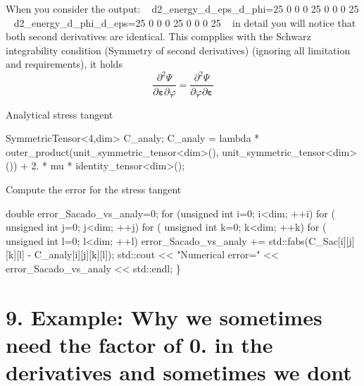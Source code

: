  When you consider the output\+: ~\newline
d2\+\_\+energy\+\_\+d\+\_\+eps\+\_\+d\+\_\+phi=25 0 0 0 25 0 0 0 25 ~\newline
d2\+\_\+energy\+\_\+d\+\_\+phi\+\_\+d\+\_\+eps=25 0 0 0 25 0 0 0 25 ~\newline
in detail you will notice that both second derivatives are identical. This compplies with the Schwarz integrability condition (Symmetry of second derivatives) (ignoring all limitation and requirements), it holds \[ \frac{\partial^2 \Psi}{\partial \boldsymbol{\varepsilon} \partial \varphi} = \frac{\partial^2 \Psi}{\partial \varphi \partial \boldsymbol{\varepsilon}} \]

Analytical stress tangent 
\begin{DoxyCode}
SymmetricTensor<4,dim> C\_analy;
C\_analy = lambda * outer\_product(unit\_symmetric\_tensor<dim>(), unit\_symmetric\_tensor<dim>()) + 2. * mu * 
      identity\_tensor<dim>();
\end{DoxyCode}
 Compute the error for the stress tangent 
\begin{DoxyCode}
     \textcolor{keywordtype}{double} error\_Sacado\_vs\_analy=0;
     \textcolor{keywordflow}{for} (\textcolor{keywordtype}{unsigned} \textcolor{keywordtype}{int} i=0; i<dim; ++i)
        \textcolor{keywordflow}{for} ( \textcolor{keywordtype}{unsigned} \textcolor{keywordtype}{int} j=0; j<dim; ++j)
            \textcolor{keywordflow}{for} ( \textcolor{keywordtype}{unsigned} \textcolor{keywordtype}{int} k=0; k<dim; ++k)
                \textcolor{keywordflow}{for} ( \textcolor{keywordtype}{unsigned} \textcolor{keywordtype}{int} l=0; l<dim; ++l)
                    error\_Sacado\_vs\_analy += std::fabs(C\_Sac[i][j][k][l] - C\_analy[i][j][k][l]);
     std::cout << \textcolor{stringliteral}{"Numerical error="} << error\_Sacado\_vs\_analy << std::endl;
\}
\end{DoxyCode}
 \hypertarget{index_Ex9}{}\section{9. Example\+: Why we sometimes need the factor of 0. in the derivatives and sometimes we don\textquotesingle{}t}\label{index_Ex9}


